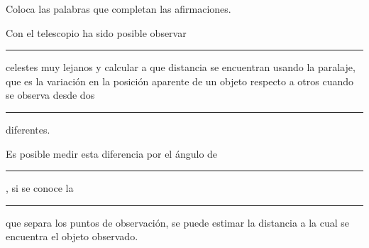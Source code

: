 Coloca las palabras que completan las afirmaciones.
\begin{parts}
    Con el telescopio ha sido posible observar \rule{3cm}{0.2mm}
    celestes muy lejanos y calcular a que distancia se encuentran usando la paralaje,
    que es la variación en la posición aparente de un objeto respecto a otros cuando
    se observa desde dos \rule{3cm}{0.2mm} diferentes.


    Es posible medir esta diferencia por el ángulo de \rule{3cm}{0.2mm}, si se conoce la
    \rule{3cm}{0.2mm} que separa los puntos de observación, se puede estimar la distancia a la
    cual se encuentra el objeto observado.

\end{parts}